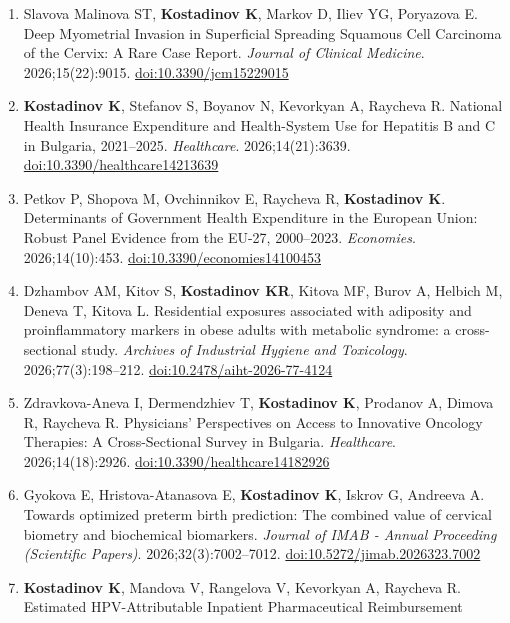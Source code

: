 \documentclass[
  10.5pt,
  a4paper,
  DIV=11,
  numbers=noendperiod]{scrartcl}
\begin{document}
\begin{enumerate}
\def\labelenumi{\arabic{enumi}.}
\item
  Slavova Malinova ST, \textbf{Kostadinov K}, Markov D, Iliev YG,
  Poryazova E. Deep Myometrial Invasion in Superficial Spreading
  Squamous Cell Carcinoma of the Cervix: A Rare Case Report.
  \emph{Journal of Clinical Medicine}. 2026;15(22):9015.
  \href{https://doi.org/10.3390/jcm15229015}{doi:10.3390/jcm15229015}
\item
  \textbf{Kostadinov K}, Stefanov S, Boyanov N, Kevorkyan A, Raycheva R.
  National Health Insurance Expenditure and Health-System Use for
  Hepatitis B and C in Bulgaria, 2021--2025. \emph{Healthcare}.
  2026;14(21):3639.
  \href{https://doi.org/10.3390/healthcare14213639}{doi:10.3390/healthcare14213639}
\item
  Petkov P, Shopova M, Ovchinnikov E, Raycheva R, \textbf{Kostadinov K}.
  Determinants of Government Health Expenditure in the European Union:
  Robust Panel Evidence from the EU-27, 2000--2023. \emph{Economies}.
  2026;14(10):453.
  \href{https://doi.org/10.3390/economies14100453}{doi:10.3390/economies14100453}
\item
  Dzhambov AM, Kitov S, \textbf{Kostadinov KR}, Kitova MF, Burov A,
  Helbich M, Deneva T, Kitova L. Residential exposures associated with
  adiposity and proinflammatory markers in obese adults with metabolic
  syndrome: a cross-sectional study. \emph{Archives of Industrial
  Hygiene and Toxicology}. 2026;77(3):198--212.
  \href{https://doi.org/10.2478/aiht-2026-77-4124}{doi:10.2478/aiht-2026-77-4124}
\item
  Zdravkova-Aneva I, Dermendzhiev T, \textbf{Kostadinov K}, Prodanov A,
  Dimova R, Raycheva R. Physicians' Perspectives on Access to Innovative
  Oncology Therapies: A Cross-Sectional Survey in Bulgaria.
  \emph{Healthcare}. 2026;14(18):2926.
  \href{https://doi.org/10.3390/healthcare14182926}{doi:10.3390/healthcare14182926}
\item
  Gyokova E, Hristova-Atanasova E, \textbf{Kostadinov K}, Iskrov G,
  Andreeva A. Towards optimized preterm birth prediction: The combined
  value of cervical biometry and biochemical biomarkers. \emph{Journal
  of IMAB - Annual Proceeding (Scientific Papers)}.
  2026;32(3):7002--7012.
  \href{https://doi.org/10.5272/jimab.2026323.7002}{doi:10.5272/jimab.2026323.7002}
\item
  \textbf{Kostadinov K}, Mandova V, Rangelova V, Kevorkyan A, Raycheva
  R. Estimated HPV-Attributable Inpatient Pharmaceutical Reimbursement

\end{enumerate}
\end{document}

